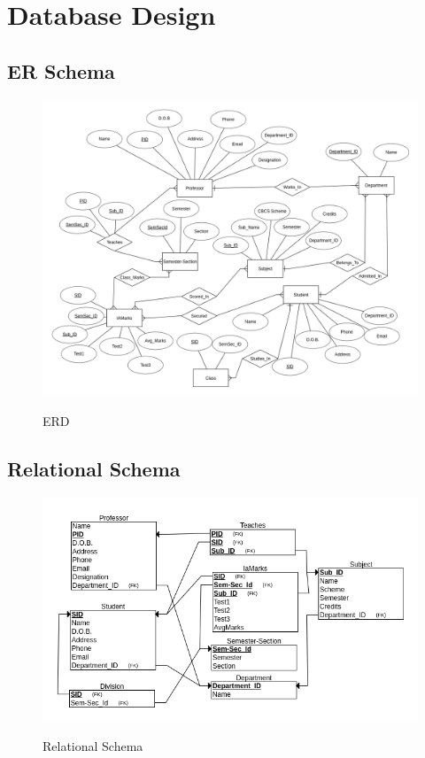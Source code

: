 \chapter{Database Design}

\section{ER Schema}
\begin{figure}[H]
\centering
\caption{ERD}
\includegraphics[scale=0.47]{./erd.png}
\label{fig:ER diagram}
\end{figure}

\thispagestyle{fancy}

\section{Relational Schema}
\begin{figure}[H]
\centering
\caption{Relational Schema}
\includegraphics[scale=.7]{./schema.png}
\\[0.2in]
\label{fig:Relational Schema}
\end{figure}

\thispagestyle{fancy}
